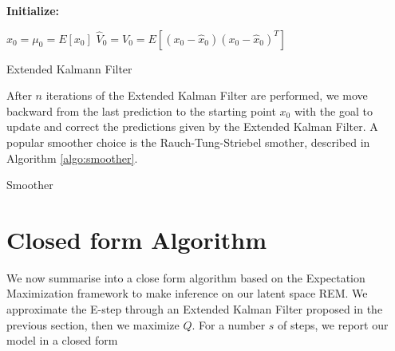 \documentclass[mscthesis]{usiinfthesis}
\begin{document}

\begin{algorithm}[t]
\textbf{Initialize: }
\begin{substeps}
$\hat{x}_0 = \mu_0 = E[x_0]$ \;
$\hat{V}_0 = V_0 = E[(x_0-\hat{x}_0)(x_0-\hat{x}_0)^T]$  \;
\end{substeps}
  \caption{Extended Kalmann Filter}
  \label{algo:ext_kalmann}
\end{algorithm}

\noindent After $n$ iterations of the Extended Kalman Filter are performed, we move backward from the last prediction to the starting point $x_0$ with the goal to update and correct the predictions given by the Extended Kalman Filter. A popular smoother choice is the Rauch-Tung-Striebel smother, described in Algorithm \ref{algo:smoother}.

\begin{algorithm}[H]
  \caption{Smoother}
  \label{algo:smoother}
\end{algorithm}

\section{Closed form Algorithm}
We now summarise into a close form algorithm based on the Expectation Maximization framework to make inference on our latent space REM. We approximate the E-step through an Extended Kalman Filter proposed in the previous section, then we maximize $Q$. For a number $s$ of steps, we report our model in a closed form
\end{document}

